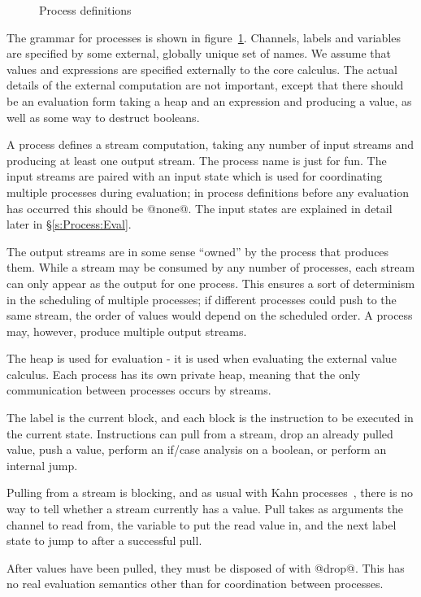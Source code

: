\begin{figure}
\caption{Process definitions}
\label{fig:Process:Def}
\end{figure}


The grammar for processes is shown in figure~\ref{fig:Process:Def}.
Channels, labels and variables are specified by some external, globally unique set of names.
We assume that values and expressions are specified externally to the core calculus.
The actual details of the external computation are not important, except that there should be an evaluation form taking a heap and an expression and producing a value, as well as some way to destruct booleans.

A process defines a stream computation, taking any number of input streams and producing at least one output stream.
The process name is just for fun.
The input streams are paired with an input state which is used for coordinating multiple processes during evaluation; in process definitions before any evaluation has occurred this should be @none@.
The input states are explained in detail later in \S\ref{s:Process:Eval}.

The output streams are in some sense ``owned'' by the process that produces them.
While a stream may be consumed by any number of processes, each stream can only appear as the output for one process.
This ensures a sort of determinism in the scheduling of multiple processes; if different processes could push to the same stream, the order of values would depend on the scheduled order.
A process may, however, produce multiple output streams.

The heap is used for evaluation - it is used when evaluating the external value calculus.
Each process has its own private heap, meaning that the only communication between processes occurs by streams.

The label is the current block, and each block is the instruction to be executed in the current state.
Instructions can pull from a stream, drop an already pulled value, push a value, perform an if/case analysis on a boolean, or perform an internal jump.

Pulling from a stream is blocking, and as usual with Kahn processes~\cite{kahn1976coroutines}, there is no way to tell whether a stream currently has a value.
Pull takes as arguments the channel to read from, the variable to put the read value in, and the next label state to jump to after a successful pull.

After values have been pulled, they must be disposed of with @drop@.
This has no real evaluation semantics other than for coordination between processes.

